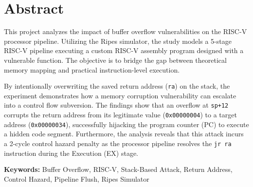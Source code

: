 \chapter*{Abstract}

This project analyzes the impact of buffer overflow vulnerabilities on the RISC-V processor pipeline. Utilizing the Ripes simulator, the study models a 5-stage RISC-V pipeline executing a custom RISC-V assembly program designed with a vulnerable function. The objective is to bridge the gap between theoretical memory mapping and practical instruction-level execution.

By intentionally overwriting the saved return address (\texttt{ra}) on the stack, the experiment demonstrates how a memory corruption vulnerability can escalate into a control flow subversion. The findings show that an overflow at \texttt{sp+12} corrupts the return address from its legitimate value (\texttt{0x00000004}) to a target address (\texttt{0x00000034}), successfully hijacking the program counter (PC) to execute a hidden code segment. Furthermore, the analysis reveals that this attack incurs a 2-cycle control hazard penalty as the processor pipeline resolves the \texttt{jr ra} instruction during the Execution (EX) stage.

\vspace{1cm}
\noindent\textbf{Keywords:} Buffer Overflow, RISC-V, Stack-Based Attack, Return Address, Control Hazard, Pipeline Flush, Ripes Simulator
\newpage
